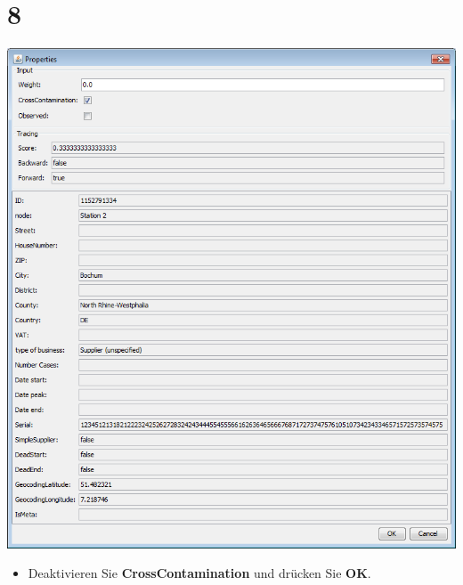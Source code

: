 \documentclass{beamer}
\begin{document}
\section{8}
\begin{frame}
	\begin{center}
  		\includegraphics[height=0.6\textheight]{8.png}
	\end{center}
	\begin{itemize}
		\item Deaktivieren Sie \textbf{CrossContamination} und drücken Sie \textbf{OK}.
	\end{itemize}
\end{frame}
\end{document}
